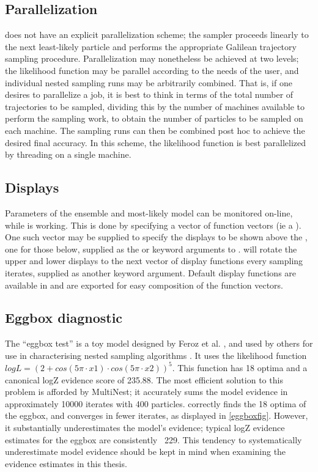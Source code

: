 \subsection{Parallelization}
 does not have an explicit parallelization scheme; the sampler proceeds linearly to the next least-likely particle and performs the appropriate Galilean trajectory sampling procedure. Parallelization may nonetheless be achieved at two levels; the likelihood function may be parallel according to the needs of the user, and individual nested sampling runs may be arbitrarily combined. That is, if one desires to parallelize a  job, it is best to think in terms of the total number of trajectories to be sampled, dividing this by the number of machines available to perform the sampling work, to obtain the number of particles to be sampled on each machine. The sampling runs can then be combined post hoc to achieve the desired final accuracy. In this scheme, the likelihood function is best parallelized by threading on a single machine.

\subsection{Displays}
Parameters of the ensemble and most-likely model can be monitored on-line, while  is working. This is done by specifying a vector of function vectors (ie a ). One such vector may be supplied to specify the displays to be shown above the , one for those below, supplied as the  or  keyword arguments to .  will rotate the upper and lower displays to the next vector of display functions every  sampling iterates, supplied as another  keyword argument. Default display functions are available in  and are exported for easy composition of the function vectors.

\subsection{Eggbox diagnostic}
\label{ssec:eggbox}
The ``eggbox test'' is a toy model designed by Feroz et al. \cite{Feroz2009}, and used by others for use in characterising nested sampling algorithms \cite{Buchner2016}. It uses the likelihood function $logL = (2 + cos(5π \cdot x1) \cdot cos(5π \cdot x2))^5$. This function has 18 optima and a canonical logZ evidence score of 235.88. The most efficient solution to this problem is afforded by MultiNest; it accurately sums the model evidence in approximately 10000 iterates with 400 particles.  correctly finds the 18 optima of the eggbox, and converges in fewer iterates, as displayed in \autoref{eggboxfig}. However, it substantially underestimates the model's evidence; typical  logZ evidence estimates for the eggbox are consistently ~229. This tendency to systematically underestimate model evidence should be kept in mind when examining the evidence estimates in this thesis.

